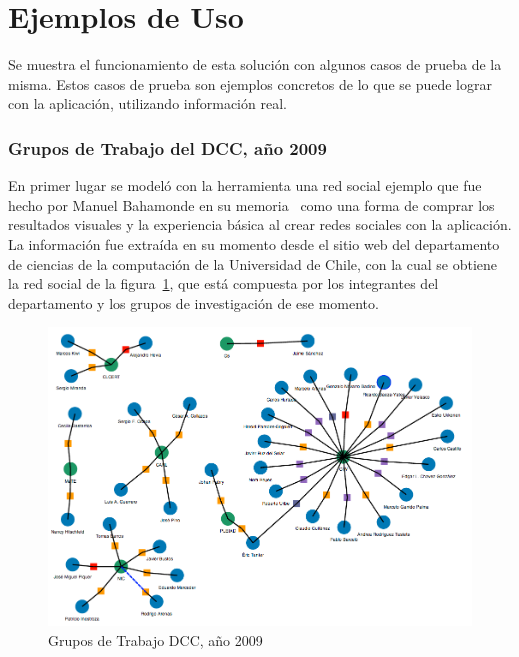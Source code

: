 
\section{Ejemplos de Uso} %
\label{sec:ejemplos_de_uso}

Se muestra el funcionamiento de esta solución con algunos casos de prueba de la misma. Estos casos de prueba son ejemplos concretos de lo que se puede lograr con la aplicación, utilizando información real.

\subsubsection{Grupos de Trabajo del DCC, año 2009} %
\label{ssub:grupos_de_trabajo_del_dcc_2009}

En primer lugar se modeló con la herramienta una red social ejemplo que fue hecho por Manuel Bahamonde en su memoria~\cite{memoriamanuel} como una forma de comprar los resultados visuales y la experiencia básica al crear redes sociales con la aplicación.\\

La información fue extraída en su momento desde el sitio web del departamento de ciencias de la computación de la Universidad de Chile, con la cual se obtiene la red social de la figura~\ref{grupos_de_trabajo_dcc}, que está compuesta por los integrantes del departamento y los grupos de investigación de ese momento.

\begin{figure}[H]
  \centering
  \includegraphics[width=1.0\textwidth]{images/grupos_de_trabajo_dcc.png}
  \caption{Grupos de Trabajo DCC, año 2009}
  \label{grupos_de_trabajo_dcc}
\end{figure}




